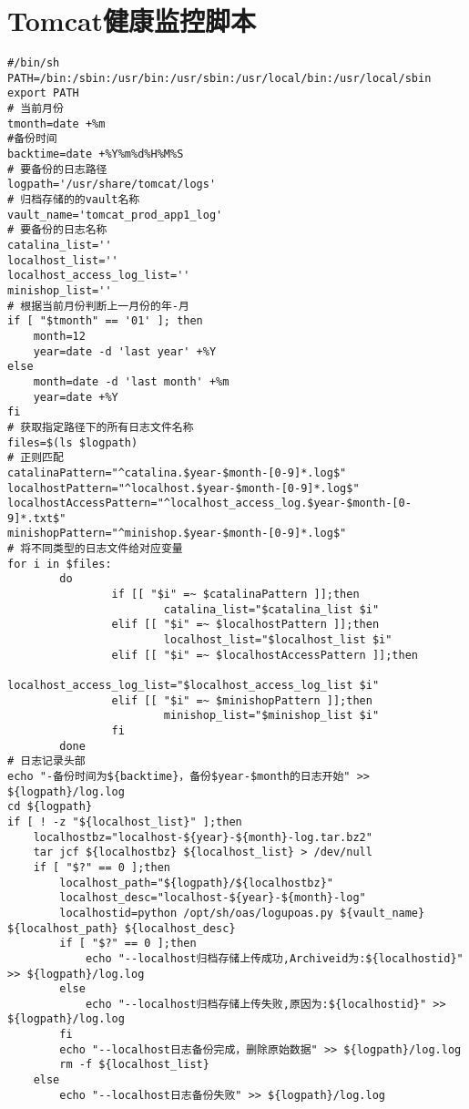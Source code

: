 \chapter{Tomcat健康监控脚本}
\label{cha:Tomcatlog}
\begin{lstlisting}[numbers=none]
#/bin/sh
PATH=/bin:/sbin:/usr/bin:/usr/sbin:/usr/local/bin:/usr/local/sbin
export PATH
# 当前月份
tmonth=date +%m
#备份时间
backtime=date +%Y%m%d%H%M%S
# 要备份的日志路径
logpath='/usr/share/tomcat/logs'
# 归档存储的的vault名称
vault_name='tomcat_prod_app1_log'
# 要备份的日志名称
catalina_list=''
localhost_list=''
localhost_access_log_list=''
minishop_list=''
# 根据当前月份判断上一月份的年-月
if [ "$tmonth" == '01' ]; then
    month=12
    year=date -d 'last year' +%Y
else
    month=date -d 'last month' +%m
    year=date +%Y
fi
# 获取指定路径下的所有日志文件名称
files=$(ls $logpath)
# 正则匹配
catalinaPattern="^catalina.$year-$month-[0-9]*.log$"
localhostPattern="^localhost.$year-$month-[0-9]*.log$"
localhostAccessPattern="^localhost_access_log.$year-$month-[0-9]*.txt$"
minishopPattern="^minishop.$year-$month-[0-9]*.log$"
# 将不同类型的日志文件给对应变量
for i in $files:
        do
                if [[ "$i" =~ $catalinaPattern ]];then
                        catalina_list="$catalina_list $i"
                elif [[ "$i" =~ $localhostPattern ]];then
                        localhost_list="$localhost_list $i"
                elif [[ "$i" =~ $localhostAccessPattern ]];then
                        localhost_access_log_list="$localhost_access_log_list $i"
                elif [[ "$i" =~ $minishopPattern ]];then
                        minishop_list="$minishop_list $i"
                fi
        done
# 日志记录头部
echo "-备份时间为${backtime}，备份$year-$month的日志开始" >> ${logpath}/log.log
cd ${logpath}
if [ ! -z "${localhost_list}" ];then
    localhostbz="localhost-${year}-${month}-log.tar.bz2"
    tar jcf ${localhostbz} ${localhost_list} > /dev/null
    if [ "$?" == 0 ];then
        localhost_path="${logpath}/${localhostbz}"
        localhost_desc="localhost-${year}-${month}-log"
        localhostid=python /opt/sh/oas/logupoas.py ${vault_name} ${localhost_path} ${localhost_desc}
        if [ "$?" == 0 ];then
            echo "--localhost归档存储上传成功,Archiveid为:${localhostid}" >> ${logpath}/log.log
        else
            echo "--localhost归档存储上传失败,原因为:${localhostid}" >> ${logpath}/log.log
        fi
        echo "--localhost日志备份完成，删除原始数据" >> ${logpath}/log.log
        rm -f ${localhost_list}
    else
        echo "--localhost日志备份失败" >> ${logpath}/log.log

\end{lstlisting}
